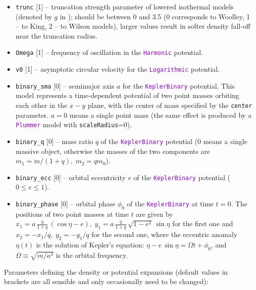 \documentclass[12pt]{article}
\newcommand{\ttt}[1]{\textcolor{darkviolet}{\texttt{#1}}}
\newcommand{\ppp}[1]{\textcolor{darkolive} {\texttt{#1}}}
\begin{document}
\begin{itemize}
\item \ppp{trunc} [1] -- truncation strength parameter of lowered isothermal models (denoted by $g$ in \cite{GielesZocchi2015}); should be between 0 and 3.5 (0 corresponds to Woolley, 1 -- to King, 2 -- to Wilson models), larger values result in softer density fall-off near the truncation radius.
\item \ppp{Omega} [1] -- frequency of oscillation in the \ttt{Harmonic} potential.
\item \ppp{v0} [1] -- asymptotic circular velocity for the \ttt{Logarithmic} potential.
\item \ppp{binary_sma} [0] -- semimajor axis $a$ for the \ttt{KeplerBinary} potential. This model represents a time-dependent potential of two point masses orbiting each other in the $x-y$ plane, with the center of mass specified by the \ppp{center} parameter. $a=0$ means a single point mass (the same effect is produced by a \ttt{Plummer} model with \ppp{scaleRadius}=0).
\item \ppp{binary_q} [0] -- mass ratio $q$ of the \ttt{KeplerBinary} potential (0 means a single massive object, otherwise the masses of the two components are $m_1=m/(1+q),\; m_2=qm_0$).
\item \ppp{binary_ecc} [0] -- orbital eccentricity $e$ of the \ttt{KeplerBinary} potential ($0\le e \le 1$).
\item \ppp{binary_phase} [0] -- orbital phase $\phi_0$ of the \ttt{KeplerBinary} at time $t=0$. The positions of two point masses at time $t$ are given by $x_1 = a\,\frac{q}{1+q}\, (\cos\eta-e),\; y_1 = a\,\frac{q}{1+q}\,\sqrt{1-e^2}\,\sin\eta$ for the first one and $x_2=-x_1/q,\; y_2=-y_1/q$ for the second one, where the eccentric anomaly $\eta(t)$ is the solution of Kepler's equation: $\eta - e\,\sin\eta = \Omega t + \phi_0$, and $\Omega \equiv \sqrt{m/a^3}$ is the orbital frequency.
\end{itemize}
Parameters defining the density or potential expansions (default values in brackets are all sensible and only occasionally need to be changed):
\end{document}
